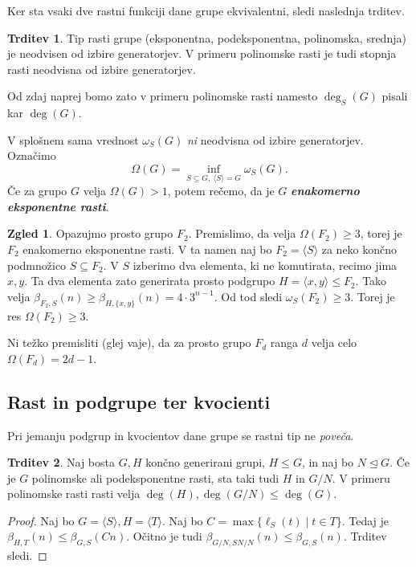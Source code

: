 \documentclass[11pt]{book}
\def\definicija{\color{rdeca}\bf\em}
\def\literatura{\color{modra}}
\def\vaje{{\literatura (glej vaje)}}
\theoremstyle{definition}
\theoremstyle{zgled}
\newtheorem*{zgled}{Zgled}
\theoremstyle{odprtproblem}
\theoremstyle{domacanaloga}
\newenvironment{dokaz}
    {\color{siva}\begin{proof}}
    {\end{proof}}
\theoremstyle{izrek}
\newtheorem*{trditev}{Trditev}
\begin{document}
Ker sta vsaki dve rastni funkciji dane grupe ekvivalentni, sledi naslednja trditev.

\begin{trditev}
Tip rasti grupe (eksponentna, podeksponentna, polinomska, srednja) je neodvisen od izbire generatorjev. V primeru polinomske rasti je tudi stopnja rasti neodvisna od izbire generatorjev.
\end{trditev}

Od zdaj naprej bomo zato v primeru polinomske rasti namesto $\deg_S(G)$ pisali kar $\deg(G)$. 

V splošnem sama vrednost $\omega_S(G)$ {\em ni} neodvisna od izbire generatorjev. Označimo
\[
\Omega(G) = \inf_{S \subseteq G, \ \langle S \rangle = G} \omega_S(G).
\]
Če za grupo $G$ velja $\Omega(G) > 1$, potem rečemo, da je $G$ {\definicija enakomerno eksponentne rasti}.

\begin{zgled}
Opazujmo prosto grupo $F_2$. Premislimo, da velja $\Omega(F_2) \geq 3$, torej je $F_2$ enakomerno eksponentne rasti. V ta namen naj bo $F_2 = \langle S \rangle$ za neko končno podmnožico $S \subseteq F_2$. V $S$ izberimo dva elementa, ki ne komutirata, recimo jima $x,y$. Ta dva elementa zato generirata prosto podgrupo $H = \langle x, y \rangle \leq F_2$. Tako velja $\beta_{F_2, S}(n) \geq \beta_{H, \{ x, y \}}(n) = 4 \cdot 3^{n-1}$. Od tod sledi $\omega_S(F_2) \geq 3$. Torej je res $\Omega(F_2) \geq 3$.

Ni težko premisliti \vaje, da za prosto grupo $F_d$ ranga $d$ velja celo $\Omega(F_d) = 2d - 1$.
\end{zgled}

\subsection{Rast in podgrupe ter kvocienti}

Pri jemanju podgrup in kvocientov dane grupe se rastni tip ne {\em poveča}.

\begin{trditev}
Naj bosta $G,H$ končno generirani grupi, $H \leq G$, in naj bo $N \unlhd G$. Če je $G$ polinomske ali podeksponentne rasti, sta taki tudi $H$ in $G/N$. V primeru polinomske rasti rasti velja $\deg(H), \deg(G/N) \leq \deg(G)$.
\end{trditev}

\begin{dokaz}
Naj bo $G = \langle S \rangle, H = \langle T \rangle$. Naj bo $C = \max \{ \ell_S(t) \mid t \in T \}$. Tedaj je $\beta_{H,T}(n) \leq \beta_{G,S}(Cn)$. Očitno je tudi $\beta_{G/N, SN/N}(n) \leq \beta_{G,S}(n)$. Trditev sledi.
\end{dokaz}
\end{document}
